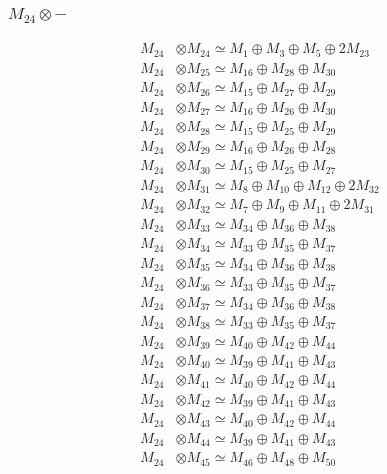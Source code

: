 \subsubsection{$ M_{24}\otimes -$}
\begin{align*}
M_{24} &\otimes M_{24} \simeq M_{1} \oplus M_{3} \oplus M_{5} \oplus 2M_{23} \\
M_{24} &\otimes M_{25} \simeq M_{16} \oplus M_{28} \oplus M_{30} \\
M_{24} &\otimes M_{26} \simeq M_{15} \oplus M_{27} \oplus M_{29} \\
M_{24} &\otimes M_{27} \simeq M_{16} \oplus M_{26} \oplus M_{30} \\
M_{24} &\otimes M_{28} \simeq M_{15} \oplus M_{25} \oplus M_{29} \\
M_{24} &\otimes M_{29} \simeq M_{16} \oplus M_{26} \oplus M_{28} \\
M_{24} &\otimes M_{30} \simeq M_{15} \oplus M_{25} \oplus M_{27} \\
M_{24} &\otimes M_{31} \simeq M_{8} \oplus M_{10} \oplus M_{12} \oplus 2M_{32} \\
M_{24} &\otimes M_{32} \simeq M_{7} \oplus M_{9} \oplus M_{11} \oplus 2M_{31} \\
M_{24} &\otimes M_{33} \simeq M_{34} \oplus M_{36} \oplus M_{38} \\
M_{24} &\otimes M_{34} \simeq M_{33} \oplus M_{35} \oplus M_{37} \\
M_{24} &\otimes M_{35} \simeq M_{34} \oplus M_{36} \oplus M_{38} \\
M_{24} &\otimes M_{36} \simeq M_{33} \oplus M_{35} \oplus M_{37} \\
M_{24} &\otimes M_{37} \simeq M_{34} \oplus M_{36} \oplus M_{38} \\
M_{24} &\otimes M_{38} \simeq M_{33} \oplus M_{35} \oplus M_{37} \\
M_{24} &\otimes M_{39} \simeq M_{40} \oplus M_{42} \oplus M_{44} \\
M_{24} &\otimes M_{40} \simeq M_{39} \oplus M_{41} \oplus M_{43} \\
M_{24} &\otimes M_{41} \simeq M_{40} \oplus M_{42} \oplus M_{44} \\
M_{24} &\otimes M_{42} \simeq M_{39} \oplus M_{41} \oplus M_{43} \\
M_{24} &\otimes M_{43} \simeq M_{40} \oplus M_{42} \oplus M_{44} \\
M_{24} &\otimes M_{44} \simeq M_{39} \oplus M_{41} \oplus M_{43} \\
M_{24} &\otimes M_{45} \simeq M_{46} \oplus M_{48} \oplus M_{50} \\

\end{align*}
